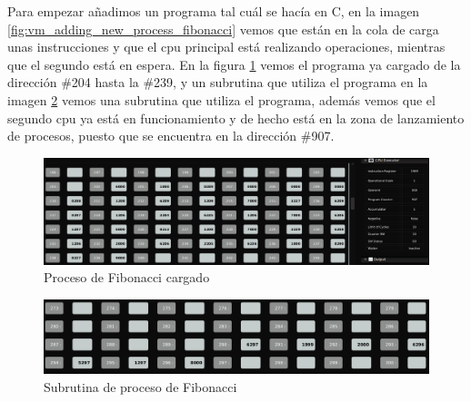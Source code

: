 \documentclass[letterpaper,12pt,oneside]{book}
\begin{document}
			
			Para empezar añadimos un programa tal cuál se hacía en C, en la imagen \ref{fig:vm_adding_new_process_fibonacci} vemos que están
			en la cola de carga unas instrucciones y que el cpu principal está realizando operaciones, mientras que el segundo
			está en espera. En la figura \ref{fig:vm_process_fibonacci_loaded} vemos el programa ya cargado de la dirección \#204 hasta la \#239,
			y un subrutina que utiliza el programa en la imagen \ref{fig:vm_subrutine_fibonacci} vemos una subrutina que utiliza el programa, además
			vemos que el segundo cpu ya está en funcionamiento y de hecho está en la zona de lanzamiento de procesos, puesto que se encuentra
			en la dirección \#907.
			
			\begin{figure}[H]		
				\centering
				\includegraphics[scale=0.3]{media/Paralela/vm_process_fibonacci_loaded_cut.png}
				\caption{Proceso de Fibonacci cargado}
				\label{fig:vm_process_fibonacci_loaded}
			\end{figure}
			
			\begin{figure}[H]		
				\centering
				\includegraphics[scale=0.35]{media/Paralela/vm_subrutine_fibonacci_cut.png}
				\caption{Subrutina de proceso de Fibonacci}
				\label{fig:vm_subrutine_fibonacci}
			\end{figure}
			
\end{document}
